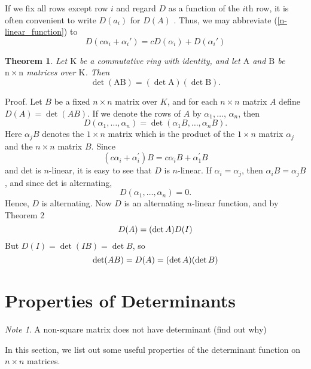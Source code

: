 \documentclass{book}
\newtheorem{thm}{Theorem}[section]
\theoremstyle{remark}
\newtheorem*{note}{Note}
\theoremstyle{definition}
\begin{document}
If we fix all rows except row $i$ and regard $D$ as a function of the $i$th row, it is often convenient to write $D(a_i)$ for $D(A)$ . Thus, we may abbreviate (\ref{n-linear_function}) to
\begin{equation*}
D(c\alpha_i + \alpha_i') = cD(\alpha_i) + D(\alpha_i')
\end{equation*}

\begin{thm}Let $\mathrm{K}$ be a commutative ring with identity, and let $\mathrm{A}$ and $\mathrm{B}$ be $\mathrm{n} \times \mathrm{n}$ matrices over $\mathrm{K}$. Then
$$
\operatorname{det}(\mathrm{AB})=(\operatorname{det} \mathrm{A})(\operatorname{det} \mathrm{B}).
$$
\end{thm}
Proof. Let $B$ be a fixed $n \times n$ matrix over $K$, and for each $n \times n$ matrix $A$ define $D(A)=\operatorname{det}(A B)$. If we denote the rows of $A$ by $\alpha_1, \ldots$, $\alpha_n$, then
$$
D\left(\alpha_1, \ldots, \alpha_n\right)=\operatorname{det}\left(\alpha_1 B, \ldots, \alpha_n B\right) .
$$
Here $\alpha_j B$ denotes the $1 \times n$ matrix which is the product of the $1 \times n$ matrix $\alpha_j$ and the $n \times n$ matrix $B$. Since
$$
\left(c \alpha_i+\alpha_i^{\prime}\right) B=c \alpha_i B+\alpha_1^{\prime} B
$$
and det is $n$-linear, it is easy to see that $D$ is $n$-linear. If $\alpha_i=\alpha_j$, then $\alpha_i B=\alpha_j B$, and since det is alternating,
$$
D\left(\alpha_1, \ldots, \alpha_n\right)=0 .
$$
Hence, $D$ is alternating. Now $D$ is an alternating $n$-linear function, and by Theorem 2
$$
D(A)=(\operatorname{det} A) D(I) \\
$$
But $D(I)=\operatorname{det}(I B)=\operatorname{det} B$, so
$$
\operatorname{det}(A B)=D(A)=(\operatorname{det} A)(\operatorname{det} B)\\
$$


\section{Properties of Determinants}
\begin{note}
A non-square matrix does not have determinant (find out why)
\end{note}


In this section, we list out some useful properties of the determinant function on $n \times n $ matrices. 
\end{document}
